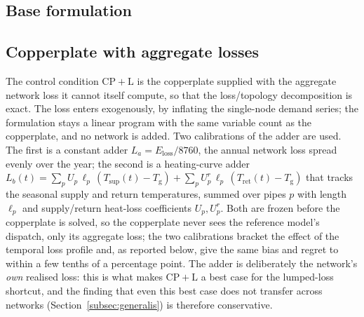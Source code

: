 \documentclass[a4paper,fleqn]{cas-sc}
\newcommand{\CPL}{\ensuremath{\mathrm{CP{+}L}}} %
\newcommand{\new}[1]{\textcolor[HTML]{1A5FB4}{#1}}   %
\newcommand{\new}[1]{#1}
\begin{document}
\subsection{Base formulation}
\new{}

\subsection{Copperplate with aggregate losses}\label{subsec:lumped}
The control condition $\CPL$ is the copperplate supplied with the aggregate network loss it
cannot itself compute, so that the loss/topology decomposition is exact. The loss enters
exogenously, by inflating the single-node demand series; the formulation stays a linear
program with the same variable count as the copperplate, and no network is added. Two
calibrations of the adder are used. The first is a constant adder $L_a = E_\text{loss}/8760$, the
annual network loss spread evenly over the year; the second is a heating-curve adder
$L_b(t)=\sum_p U_p\,\ell_p\,(T_\text{sup}(t)-T_\text{g})+\sum_p U^r_p\,\ell_p\,(T_\text{ret}(t)-T_\text{g})$
that tracks the seasonal supply and return temperatures, summed over pipes $p$ with
length $\ell_p$ and supply/return heat-loss coefficients $U_p,U^r_p$. Both are frozen before
the copperplate is solved, so the copperplate never sees the reference model's dispatch, only
its aggregate loss; the two calibrations bracket the effect of the temporal loss profile and,
as reported below, give the same bias and regret to within a few tenths of a percentage point.
The adder is deliberately the network's \emph{own} realised loss: this is what makes $\CPL$ a
best case for the lumped-loss shortcut, and the finding that even this best case does not
transfer across networks (Section~\ref{subsec:generalis}) is therefore conservative.
\end{document}
